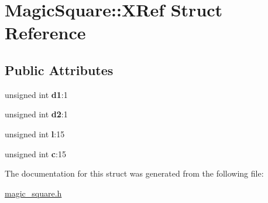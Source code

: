\hypertarget{structMagicSquare_1_1XRef}{
\section{MagicSquare::XRef Struct Reference}
\label{structMagicSquare_1_1XRef}
}
\subsection*{Public Attributes}
\begin{DoxyCompactItemize}
\item 
\hypertarget{structMagicSquare_1_1XRef_a9da1ebfcf74bd506f8705783e92d764f}{
unsigned int {\bfseries d1}:1}
\label{structMagicSquare_1_1XRef_a9da1ebfcf74bd506f8705783e92d764f}

\item 
\hypertarget{structMagicSquare_1_1XRef_ad1d07d5c5ff273961e4329af5a8ff2d0}{
unsigned int {\bfseries d2}:1}
\label{structMagicSquare_1_1XRef_ad1d07d5c5ff273961e4329af5a8ff2d0}

\item 
\hypertarget{structMagicSquare_1_1XRef_af86bd806c544303f25ee0feca31afc57}{
unsigned int {\bfseries l}:15}
\label{structMagicSquare_1_1XRef_af86bd806c544303f25ee0feca31afc57}

\item 
\hypertarget{structMagicSquare_1_1XRef_aac7b71199e3718a13b6a7853469ace7e}{
unsigned int {\bfseries c}:15}
\label{structMagicSquare_1_1XRef_aac7b71199e3718a13b6a7853469ace7e}

\end{DoxyCompactItemize}


The documentation for this struct was generated from the following file:\begin{DoxyCompactItemize}
\item 
\hyperlink{magic__square_8h}{magic\_\-square.h}\end{DoxyCompactItemize}
